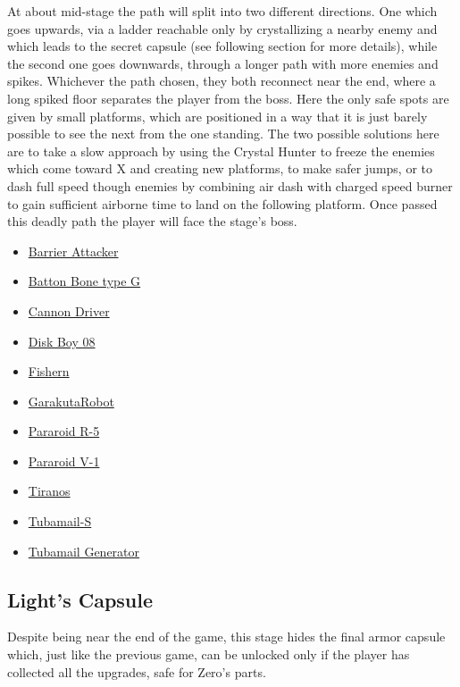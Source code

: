 At about mid-stage the path will split into two different directions. One which goes upwards, via a ladder reachable only by crystallizing a nearby enemy and which leads to the secret capsule (see following section for more details), while the second one goes downwards, through a longer path with more enemies and spikes. Whichever the path chosen, they both reconnect near the end, where a long spiked floor separates the player from the boss. Here the only safe spots are given by small platforms, which are positioned in a way that it is just barely possible to see the next from the one standing. The two possible solutions here are to take a slow approach by using the Crystal Hunter to freeze the enemies which come toward X and creating new platforms, to make safer jumps, or to dash full speed though enemies by combining air dash with charged speed burner to gain sufficient airborne time to land on the following platform. Once passed this deadly path the player will face the stage's boss.
\begin{itemize}
	\item \hyperlink{enem:Barrier_Attacker}{Barrier Attacker}
	\item \hyperlink{enem:Batton_Bone_type_G}{Batton Bone type G}
	\item \hyperlink{enem:Cannon_Driver}{Cannon Driver}
	\item \hyperlink{enem:Disk_Boy_08}{Disk Boy 08}
	\item \hyperlink{enem:Fishern}{Fishern}
	\item \hyperlink{enem:Garakuta_Robot}{GarakutaRobot}
	\item \hyperlink{enem:Pararoid_R-5}{Pararoid R-5}
	\item \hyperlink{enem:Pararoid_V-1}{Pararoid V-1}
	\item \hyperlink{enem:Tiranos}{Tiranos}
	\item \hyperlink{enem:Tubamail-S}{Tubamail-S}
	\item \hyperlink{enem:Tubamail_Generator}{Tubamail Generator}
\end{itemize}


\subsection{Light's Capsule}\label{X2:Shoryuken}
Despite being near the end of the game, this stage hides the final armor capsule which, just like the previous game, can be unlocked only if the player has collected all the upgrades, safe for Zero's parts. 

